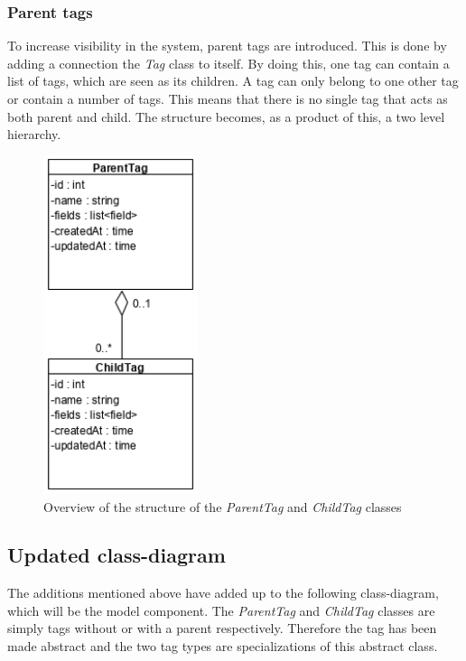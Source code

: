 
\subsubsection{Parent tags}
To increase visibility in the system, parent tags are introduced. This is done by adding a connection the \textit{Tag} class to itself. By doing this, one tag can contain a list of tags, which are seen as its children. A tag can only belong to one other tag or contain a number of tags. This means that there is no single tag that acts as both parent and child. The structure becomes, as a product of this, a two level hierarchy.

\begin{figure}[H]
    \centering
    \includegraphics[width=0.4\textwidth]{figures/Structures/TagHierarchy.png}
    \caption{Overview of the structure of the \textit{ParentTag} and \textit{ChildTag} classes}
    \label{fig:TagHierarchy}
\end{figure}

\subsection{Updated class-diagram}
The additions mentioned above have added up to the following class-diagram, which will be the model component. The \textit{ParentTag} and \textit{ChildTag} classes are simply tags without or with a parent respectively. Therefore the tag has been made abstract and the two tag types are specializations of this abstract class.

